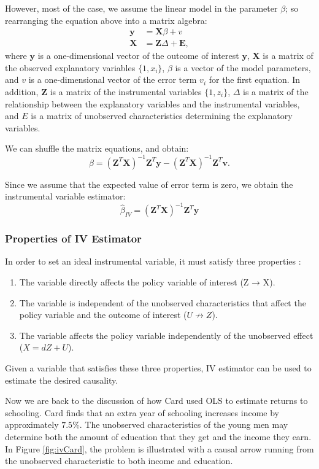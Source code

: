 \documentclass{article}\usepackage[]{graphicx}\usepackage[]{xcolor}
\begin{document}
However, most of the case, we assume the linear model in the parameter $\beta$; 
so rearranging the equation above into a matrix algebra:
\begin{align*}
\mathbf{y}&=\mathbf{X}\beta+v\\
\mathbf{X}&=\mathbf{Z}\Delta+\mathbf{E},
\end{align*}
where $\mathbf{y}$ is a one-dimensional vector of the outcome of interest $\mathbf{y}$, $\mathbf{X}$ is a matrix of the observed explanatory variables $\{1, x_i\}$, $\beta$ is a vector of the model parameters, and $v$ is a one-dimensional vector of the error term $v_i$ for the first equation.
In addition, $\mathbf{Z}$ is a matrix of the instrumental variables $\{1, z_i\}$, $\Delta$ is a matrix of the relationship between the explanatory variables and the instrumental variables, and $E$ is a matrix of unobserved characteristics determining the explanatory variables.

We can shuffle the matrix equations, and obtain:
$$\beta = \left(\mathbf{Z}^T\mathbf{X}\right)^{-1}\mathbf{Z}^T\mathbf{y} - 
\left(\mathbf{Z}^T\mathbf{X}\right)^{-1}\mathbf{Z}^T\mathbf{v}.$$

Since we assume that the expected value of error term is zero, we obtain the instrumental variable estimator:
$$\hat\beta_{IV}=\left(\mathbf{Z}^T\mathbf{X}\right)^{-1}\mathbf{Z}^T\mathbf{y}$$
\subsubsection*{Properties of IV Estimator}
In order to set an ideal instrumental variable, it must satisfy three properties \citep{angrist2014mastering}:
\begin{enumerate}[itemsep=-5mm]
  \item The variable directly affects the policy variable of interest (Z → X).\\
  \item The variable is independent of the unobserved characteristics that
affect the policy variable and the outcome of interest ($U \not\to Z$).\\
  \item The variable affects the policy variable independently of the unobserved effect ($X = dZ + U$).
\end{enumerate}

Given a variable that satisfies these three properties, 
IV estimator can be used to estimate the desired causality.

Now we are back to the discussion of how Card used OLS to estimate returns to schooling. 
Card finds that an extra year of schooling increases income by approximately $7.5\%$. 
The unobserved characteristics of the young men may determine both the amount of education that they get and the income they earn. 
In Figure \ref{fig:ivCard}, the problem is illustrated with a causal arrow running from the unobserved characteristic to both income and education.
\end{document}
